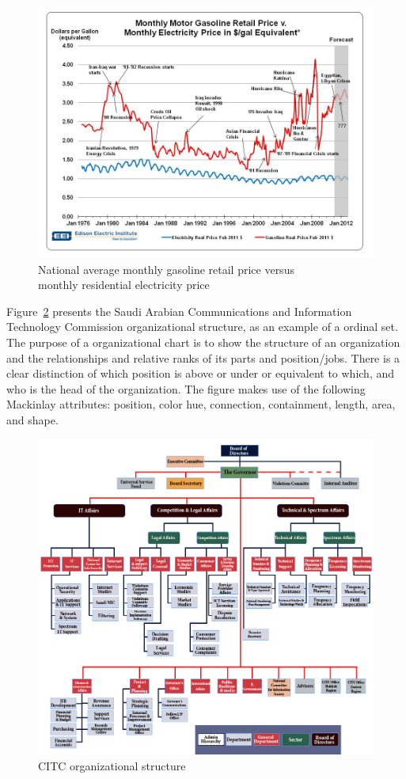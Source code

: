 \begin{figure}[H]
\centering
\includegraphics[width=.6\textwidth]{figures/energy2012short}
\caption{National average monthly gasoline retail price versus \\ monthly residential electricity
price~\cite{energy2012short}}
\label{fig:energy2012short}
\end{figure}

Figure~\ref{fig:citc2013organizational} presents the Saudi Arabian
Communications and Information Technology Commission organizational structure,
as an example of a ordinal set. The purpose of a organizational chart is to show
the structure of an organization and the relationships and relative ranks of its
parts and position/jobs. There is a clear distinction of which position is above
or under or equivalent to which, and who is the head of the organization. The
figure makes use of the following Mackinlay attributes: position, color hue,
connection, containment, length, area, and shape.

\begin{figure}[H]
\centering
\includegraphics[width=.6\textwidth]{figures/citc2013organizational}
\caption{CITC organizational structure~\cite{citc2013organizational}}
\label{fig:citc2013organizational}
\end{figure}


